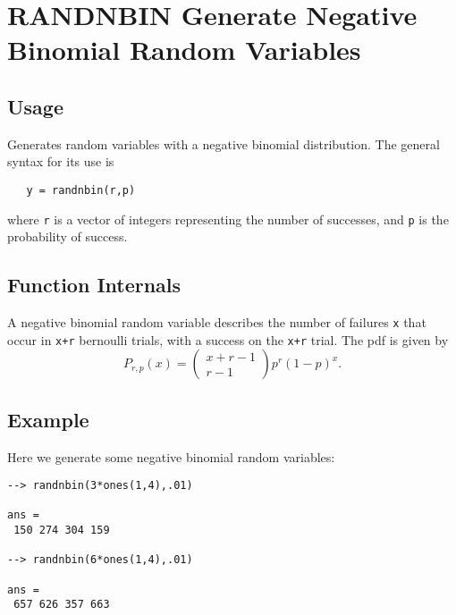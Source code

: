 \section{RANDNBIN Generate Negative Binomial Random Variables}

\subsection{Usage}

Generates random variables with a negative binomial distribution.
The general syntax for its use is
\begin{verbatim}
   y = randnbin(r,p)
\end{verbatim}
where \verb|r| is a vector of integers representing the number of
successes, and \verb|p| is the probability of success.
\subsection{Function Internals}

A negative binomial random variable describes the number of failures
\verb|x| that occur in \verb|x+r| bernoulli trials, with a success on the 
\verb|x+r| trial.  The pdf is given by
\[
  P_{r,p}(x)=\left(\begin{matrix} x+r-1 \\ r-1 \end{matrix}\right)p^r(1-p)^x.
\]
\subsection{Example}

Here we generate some negative binomial random variables:
\begin{verbatim}
--> randnbin(3*ones(1,4),.01)

ans = 
 150 274 304 159 

--> randnbin(6*ones(1,4),.01)

ans = 
 657 626 357 663 
\end{verbatim}
